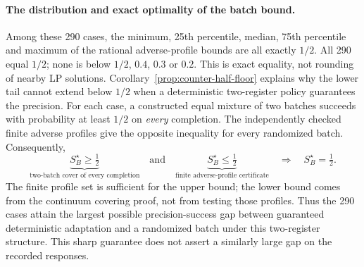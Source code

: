 \paragraph{The distribution and exact optimality of the batch bound.}
Among these 290 cases, the minimum, 25th percentile, median, 75th
percentile and maximum of the rational adverse-profile bounds are all
exactly $1/2$. All 290 equal $1/2$; none is below $1/2$, $0.4$, $0.3$
or $0.2$. This is exact equality, not rounding of nearby LP solutions.
Corollary~\ref{prop:counter-half-floor} explains why the lower tail
cannot extend below $1/2$ when a deterministic two-register policy
guarantees the precision. For each case, a constructed equal mixture of
two batches succeeds with probability at least $1/2$ on \emph{every}
completion. The independently checked finite adverse profiles give the
opposite inequality for every randomized batch. Consequently,
\[
 \underbrace{S_B^\star\geq\tfrac12}_{\text{two-batch cover of every completion}}
 \quad\text{and}\quad
 \underbrace{S_B^\star\leq\tfrac12}_{\text{finite adverse-profile certificate}}
 \quad\Longrightarrow\quad S_B^\star=\tfrac12.
\]
The finite profile set is sufficient for the upper bound; the lower bound
comes from the continuum covering proof, not from testing those profiles.
Thus the 290 cases attain the largest possible precision-success gap
between guaranteed deterministic adaptation and a randomized batch under
this two-register structure. This sharp guarantee does not assert a
similarly large gap on the recorded responses.

